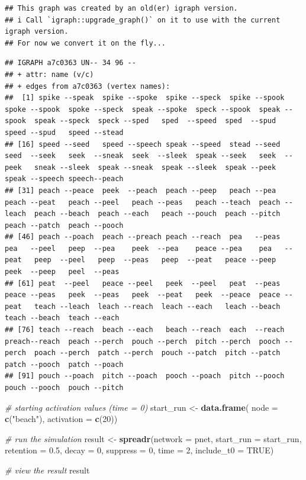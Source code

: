 \documentclass[
]{book}
\newenvironment{Shaded}{\begin{snugshade}}{\end{snugshade}}
\newcommand{\AttributeTok}[1]{\textcolor[rgb]{0.13,0.29,0.53}{#1}}
\newcommand{\CommentTok}[1]{\textcolor[rgb]{0.56,0.35,0.01}{\textit{#1}}}
\newcommand{\ConstantTok}[1]{\textcolor[rgb]{0.56,0.35,0.01}{#1}}
\newcommand{\DecValTok}[1]{\textcolor[rgb]{0.00,0.00,0.81}{#1}}
\newcommand{\FloatTok}[1]{\textcolor[rgb]{0.00,0.00,0.81}{#1}}
\newcommand{\FunctionTok}[1]{\textcolor[rgb]{0.13,0.29,0.53}{\textbf{#1}}}
\newcommand{\NormalTok}[1]{#1}
\newcommand{\OtherTok}[1]{\textcolor[rgb]{0.56,0.35,0.01}{#1}}
\newcommand{\StringTok}[1]{\textcolor[rgb]{0.31,0.60,0.02}{#1}}
\begin{document}
\begin{verbatim}
## This graph was created by an old(er) igraph version.
## i Call `igraph::upgrade_graph()` on it to use with the current igraph version.
## For now we convert it on the fly...
\end{verbatim}

\begin{verbatim}
## IGRAPH a7c0363 UN-- 34 96 -- 
## + attr: name (v/c)
## + edges from a7c0363 (vertex names):
##  [1] spike --speak  spike --spoke  spike --speck  spike --spook  spoke --spook  spoke --speck  speak --spoke  speck --spook  speak --spook  speak --speck  speck --sped   sped  --speed  sped  --spud   speed --spud   speed --stead 
## [16] speed --seed   speed --speech speak --speed  stead --seed   seed  --seek   seek  --sneak  seek  --sleek  speak --seek   seek  --peek   sneak --sleek  speak --sneak  speak --sleek  speak --peek   speak --speech speech--peach 
## [31] peach --peace  peek  --peach  peach --peep   peach --pea    peach --peat   peach --peel   peach --peas   peach --teach  peach --leach  peach --beach  peach --each   peach --pouch  peach --pitch  peach --patch  peach --pooch 
## [46] peach --poach  peach --preach peach --reach  pea   --peas   pea   --peel   peep  --pea    peek  --pea    peace --pea    pea   --peat   peep  --peel   peep  --peas   peep  --peat   peace --peep   peek  --peep   peel  --peas  
## [61] peat  --peel   peace --peel   peek  --peel   peat  --peas   peace --peas   peek  --peas   peek  --peat   peek  --peace  peace --peat   teach --leach  leach --reach  leach --each   leach --beach  teach --beach  teach --each  
## [76] teach --reach  beach --each   beach --reach  each  --reach  preach--reach  peach --perch  pouch --perch  pitch --perch  pooch --perch  poach --perch  patch --perch  pouch --patch  pitch --patch  patch --pooch  patch --poach 
## [91] pouch --poach  pitch --poach  pooch --poach  pitch --pooch  pouch --pooch  pouch --pitch
\end{verbatim}

\begin{Shaded}
\begin{Highlighting}[]
\CommentTok{\# starting activation values (time = 0)}
\NormalTok{start\_run }\OtherTok{\textless{}{-}} \FunctionTok{data.frame}\NormalTok{(}
  \AttributeTok{node =} \FunctionTok{c}\NormalTok{(}\StringTok{"beach"}\NormalTok{),}
  \AttributeTok{activation =} \FunctionTok{c}\NormalTok{(}\DecValTok{20}\NormalTok{))}

\CommentTok{\# run the simulation}
\NormalTok{result }\OtherTok{\textless{}{-}} \FunctionTok{spreadr}\NormalTok{(}\AttributeTok{network =}\NormalTok{ pnet, }\AttributeTok{start\_run =}\NormalTok{ start\_run, }
                  \AttributeTok{retention =} \FloatTok{0.5}\NormalTok{, }\AttributeTok{decay =} \DecValTok{0}\NormalTok{, }\AttributeTok{suppress =} \DecValTok{0}\NormalTok{,}
                  \AttributeTok{time =} \DecValTok{2}\NormalTok{, }\AttributeTok{include\_t0 =} \ConstantTok{TRUE}\NormalTok{)}

\CommentTok{\# view the result }
\NormalTok{result}
\end{Highlighting}
\end{Shaded}
\end{document}
